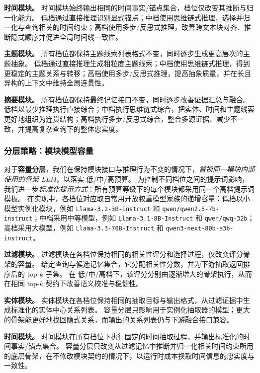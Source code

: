 \textbf{时间模块。}
时间模块始终输出相同的时间事实/锚点集合，档位仅改变其推断与归一化能力。
\textsc{低}档通过直接推理识别显式锚点；\textsc{中}档使用思维链式推理，选择并归一化与查询相关的时间约束；\textsc{高}档使用多步/反思式推理，改善跨文本块对齐、推断隐式顺序并促进全局时间线一致性。

\textbf{主题模块。}
所有档位都保持主题线索列表格式不变，同时逐步生成更高层次的主题抽象。
\textsc{低}档通过直接推理生成粗粒度主题线索；\textsc{中}档使用思维链式推理，得到更稳定的主题关系与转移；\textsc{高}档使用多步/反思式推理，提高抽象质量，并在长且异构的上下文中维持全局连贯性。

\textbf{摘要模块。}
所有档位都保持最终记忆接口不变，同时逐步改善证据汇总与融合。
\textsc{低}档以最少推理执行直接综合；\textsc{中}档执行思维链式综合，把实体、时间和主题线索更好地组织为连贯结构；\textsc{高}档执行多步/反思式综合，整合多源证据、减少不一致，并提高复杂查询下的整体忠实度。

\subsubsection{分层策略：模块模型容量}

对于\textbf{容量分层}，我们在保持模块接口与推理行为不变的情况下，\emph{替换同一模块内部使用的骨架 LLM}，以落实 \textsc{低}/\textsc{中}/\textsc{高}预算。
为控制不同档位之间的提示词影响，我们进一步\emph{标准化提示方式}：所有预算等级下的每个模块都采用同一个\textsc{高}档提示词模板。
在实现中，各档位对应取自常用开放权重模型家族的递增容量：\textsc{低}档以小模型实例化模块，例如 \texttt{Llama-3.2-3B-Instruct} 和 \texttt{qwen/qwen2.5-7b-instruct}；\textsc{中}档采用中等模型，例如 \texttt{Llama-3.1-8B-Instruct} 和 \texttt{qwen/qwq-32b}；\textsc{高}档采用大模型，例如 \texttt{Llama-3.3-70B-Instruct} 和 \texttt{qwen3-next-80b-a3b-instruct}。

\textbf{过滤模块。}
过滤模块在各档位保持相同的相关性评分和选择过程，仅改变评分骨架的容量。
给定查询与候选记忆集合，它分配相关性分数，并为下游抽取返回排序后的 top-$k$ 子集。
在 \textsc{低}/\textsc{中}/\textsc{高}档下，该评分分别由逐渐增大的骨架执行，从而在相同 top-$k$ 契约下改善语义校准与稳健性。

\textbf{实体模块。}
实体模块在各档位保持相同的抽取目标与输出格式，从过滤证据中生成标准化的实体中心关系列表。
容量分层只影响用于实例化抽取器的模型；更大的骨架能更好地找回隐式关系，而输出的关系列表仍与下游融合接口兼容。

\textbf{时间模块。}
时间模块在所有档位下执行固定的时间抽取过程，并输出标准化的时间事实/锚点集合。
容量分层只改变从过滤记忆中推断并归一化相关时间约束所用的底层骨架，在不修改模块契约的情况下，以运行时成本换取时间信息的忠实度与一致性。

